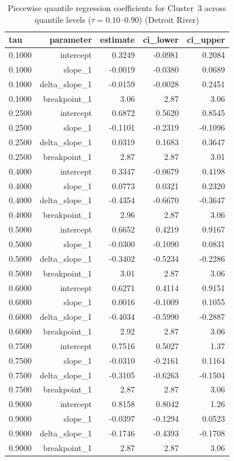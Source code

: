 \begin{table}[htbp]
  \centering
  \caption{Piecewise quantile regression coefficients for Cluster~3 across quantile levels ($\tau = 0.10$--$0.90$) (Detroit River)}
  \label{tab:dr_05_piecewise_qr_qr_coefficients_cluster_3}
  \begin{tabular}{lrrrr}
    \toprule
    tau & parameter & estimate & ci\_lower & ci\_upper \\
    \midrule
    0.1000 & intercept & 0.3249 & -0.0981 & 0.2084 \\
    0.1000 & slope\_1 & -0.0019 & -0.0380 & 0.0689 \\
    0.1000 & delta\_slope\_1 & -0.0159 & -0.0028 & 0.2451 \\
    0.1000 & breakpoint\_1 & 3.06 & 2.87 & 3.06 \\
    0.2500 & intercept & 0.6872 & 0.5620 & 0.8545 \\
    0.2500 & slope\_1 & -0.1101 & -0.2319 & -0.1096 \\
    0.2500 & delta\_slope\_1 & 0.0319 & 0.1683 & 0.3647 \\
    0.2500 & breakpoint\_1 & 2.87 & 2.87 & 3.01 \\
    0.4000 & intercept & 0.3347 & -0.0679 & 0.4198 \\
    0.4000 & slope\_1 & 0.0773 & 0.0321 & 0.2320 \\
    0.4000 & delta\_slope\_1 & -0.4354 & -0.6670 & -0.3647 \\
    0.4000 & breakpoint\_1 & 2.96 & 2.87 & 3.06 \\
    0.5000 & intercept & 0.6652 & 0.4219 & 0.9167 \\
    0.5000 & slope\_1 & -0.0300 & -0.1090 & 0.0831 \\
    0.5000 & delta\_slope\_1 & -0.3402 & -0.5234 & -0.2286 \\
    0.5000 & breakpoint\_1 & 3.01 & 2.87 & 3.06 \\
    0.6000 & intercept & 0.6271 & 0.4114 & 0.9151 \\
    0.6000 & slope\_1 & 0.0016 & -0.1009 & 0.1055 \\
    0.6000 & delta\_slope\_1 & -0.4034 & -0.5990 & -0.2887 \\
    0.6000 & breakpoint\_1 & 2.92 & 2.87 & 3.06 \\
    0.7500 & intercept & 0.7516 & 0.5027 & 1.37 \\
    0.7500 & slope\_1 & -0.0310 & -0.2161 & 0.1164 \\
    0.7500 & delta\_slope\_1 & -0.3105 & -0.6263 & -0.1504 \\
    0.7500 & breakpoint\_1 & 2.87 & 2.87 & 3.06 \\
    0.9000 & intercept & 0.8158 & 0.8042 & 1.26 \\
    0.9000 & slope\_1 & -0.0397 & -0.1294 & 0.0523 \\
    0.9000 & delta\_slope\_1 & -0.1746 & -0.4393 & -0.1708 \\
    0.9000 & breakpoint\_1 & 2.87 & 2.87 & 3.06 \\
    \bottomrule
  \end{tabular}
\end{table}
